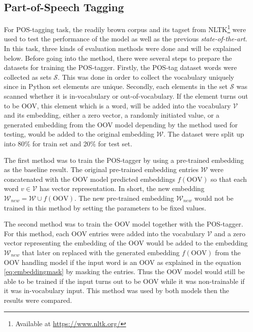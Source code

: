     \subsection{Part-of-Speech Tagging}
        For POS-tagging task, the readily brown corpus and its tagset
        from NLTK\footnote{Available at \url{https://www.nltk.org/}}
        were used to test the performance of the model as well as the
        previous \textit{state-of-the-art}. In this task, three kinds of
        evaluation methods were done and will be explained below.
        Before going into the method, there were several steps to
        prepare the datasets for training the POS-tagger. Firstly, the
        POS-tag dataset words were collected as sets $\mathcal{S}$.
        This was done in order to collect the vocabulary uniquely
        since in Python set elements are unique. Secondly, each
        elements in the set $\mathcal{S}$ was scanned whether it is
        in-vocabulary or out-of-vocabulary. If the element turns out
        to be OOV, this element which is a word, will be added into
        the vocabulary $\mathcal{V}$ and its embedding, either a zero
        vector, a randomly initiated value, or a generated embedding
        from the OOV model depending by the method used for testing,
        would be added to the original embedding $\mathcal{W}$. The
        dataset were split up into 80\% for train set and 20\% for
        test set.

        The first method was to train the POS-tagger by using a
        pre-trained embedding as the baseline result. The original
        pre-trained embedding entries $\mathcal{W}$ were concatenated
        with the OOV model predicted embeddings $f(\text{OOV})$ so
        that each word $v \in \mathcal{V}$ has vector representation.
        In short, the new embedding $\mathcal{W}_{new} = \mathcal{W}
        \cup f(\text{OOV})$. The new pre-trained embedding
        $\mathcal{W}_{new}$ would not be trained in this method by
        setting the parameters to be fixed values.

        The second method was to train the OOV model together with the
        POS-tagger. For this method, each OOV entries were added into
        the vocabulary $\mathcal{V}$ and a zero vector representing the
        embedding of the OOV would be added to the embedding
        $\mathcal{W}_{new}$ that later on replaced with the generated
        embedding $f(\text{OOV})$ from the OOV handling model if the input word is an OOV as
        explained in the equation \ref{eq:embeddingmask} by masking
        the entries. Thus the OOV model would still be able to be
        trained if the input turns out to be OOV while it was
        non-trainable if it was in-vocabulary input. This method was
        used by both models then the results were compared.


